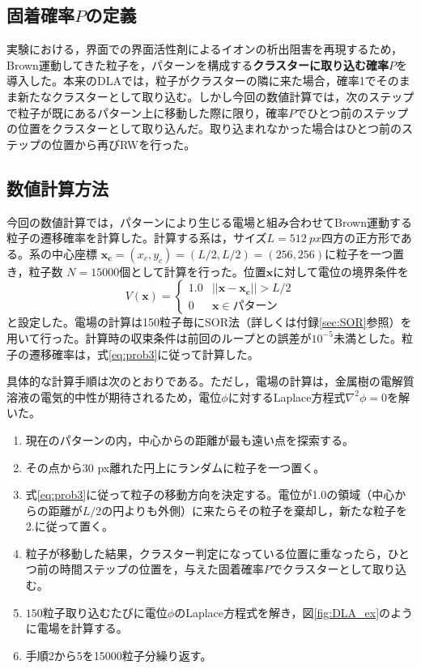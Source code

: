 \documentclass[autodetect-engine,dvi=dvipdfmx,a4paper,ja=standard,oneside,openany,11pt]{bxjsbook}
\begin{document}
\subsection{固着確率$P$の定義}
実験における，界面での界面活性剤によるイオンの析出阻害を再現するため，Brown運動してきた粒子を，パターンを構成する\textbf{クラスターに取り込む確率$P$}を導入した。本来のDLAでは，粒子がクラスターの隣に来た場合，確率1でそのまま新たなクラスターとして取り込む。しかし今回の数値計算では，次のステップで粒子が既にあるパターン上に移動した際に限り，確率$P$でひとつ前のステップの位置をクラスターとして取り込んだ。取り込まれなかった場合はひとつ前のステップの位置から再びRWを行った。
\subsection{数値計算方法}
今回の数値計算では，パターンにより生じる電場と組み合わせてBrown運動する粒子の遷移確率を計算した。計算する系は，サイズ$L=\SI{512}{px}$四方の正方形である。系の中心座標 $\bm{x_c}=(x_c,y_c)=(L/2,L/2)=(256,256)$に粒子を一つ置き，粒子数 $N=15000$個として計算を行った。位置$\bm{x}$に対して電位の境界条件を
\begin{equation}
  V(\bm{x})=
  \begin{cases}
    1.0 & ||\bm{x}-\bm{x_c}||>L/2 \\
    0   & \bm{x}\in\text{パターン}
  \end{cases}
  \label{eq:boundary_sim}
\end{equation}
と設定した。電場の計算は150粒子毎にSOR法（詳しくは付録\ref{sec:SOR}参照）を用いて行った。計算時の収束条件は前回のループとの誤差が$10^{-5}$未満とした。粒子の遷移確率は，式\eqref{eq:prob3}に従って計算した。

具体的な計算手順は次のとおりである。ただし，電場の計算は，金属樹の電解質溶液の電気的中性が期待されるため，電位$\phi$に対するLaplace方程式$\nabla^2\phi=0$を解いた。
\begin{samepage}
  \begin{enumerate}
    \item 現在のパターンの内，中心からの距離が最も遠い点を探索する。
    \item その点から30 px離れた円上にランダムに粒子を一つ置く。
    \item 式\eqref{eq:prob3}に従って粒子の移動方向を決定する。電位が1.0の領域（中心からの距離が$L/2$の円よりも外側）に来たらその粒子を棄却し，新たな粒子を2.に従って置く。
    \item 粒子が移動した結果，クラスター判定になっている位置に重なったら，ひとつ前の時間ステップの位置を，与えた固着確率$P$でクラスターとして取り込む。
    \item $150$粒子取り込むたびに電位$\phi$のLaplace方程式を解き，図\ref{fig:DLA_ex}のように電場を計算する。
    \item 手順2から5を15000粒子分繰り返す。
  \end{enumerate}
\end{samepage}
\end{document}
